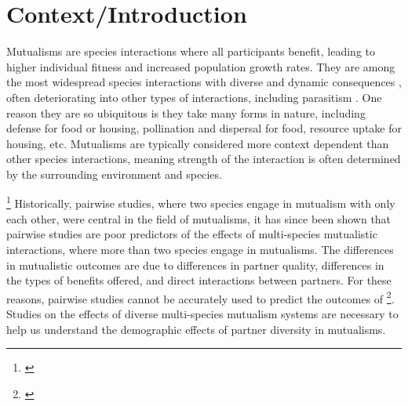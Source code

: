 \documentclass[12pt,a4paper]{article}
\newcommand{\tom}[2]{{\color{red}{#1}}\footnote{\textit{\color{red}{#2}}}}
\newcommand{\ali}[2]{{\color{pink}{#1}}\footnote{\textit{\color{pink}{#2}}}}
\begin{document}
\section*{Context/Introduction}

Mutualisms are species interactions where all participants benefit, leading to higher individual fitness and increased population growth rates. 
They are among the most widespread species interactions\cite{Chamberlain2014, BoucherDouglasH.1985} with diverse and dynamic consequences \cite{Bronstein1994,Chamberlain2014,Frederickson2013}, often deteriorating into other types of interactions, including parasitism \cite{Rodriguez-Rodriguez2017,Song2020,Mandyam2014,Thrall2007, Bahia2022}.
One reason they are so ubiquitous is they take many forms in nature, including defense for food or housing\cite{Willmer1997}, pollination and dispersal for food\cite{Sakai2002,Burns2004}, resource uptake for housing\cite{Holland2010}, etc. 
Mutualisms are typically considered more context dependent than other species interactions\cite{Chamberlain2014,Frederickson2013}, meaning strength of the interaction is often determined by the surrounding environment and species. 

\ali{}{I don't love this paragraph. Help. I particularly don't like how I defined multispecies mutualisms vs pairwise}
Historically, pairwise studies, where two species engage in mutualism with only each other, were central in the field of mutualisms, it has since been shown that pairwise studies are poor predictors of the effects of multi-species mutualistic interactions\cite{Afkhami2014,Palmer2010}, where more than two species engage in mutualisms.
The differences in mutualistic outcomes are due to differences in partner quality\cite{Bascompte2019,Stanton2013,Frederickson2013,Jones2015, Ness2006}, differences in the types of benefits offered\cite{Kiers2003,Afkhami2014}, and direct interactions between partners\cite{Sun2019,Heath2009,Heath2014,Grutter2003}.
For these reasons, pairwise studies cannot be accurately used to predict the outcomes of \tom{multi-species mutualisms}{I think you need to operationally define this.}\cite{Palmer2010, Stanton2013, Chamberlain2014, Song2020}.
Studies on the effects of diverse multi-species mutualism systems are necessary to help us understand the demographic effects of partner diversity in mutualisms\cite{Bascompte2019}. 
\end{document}
